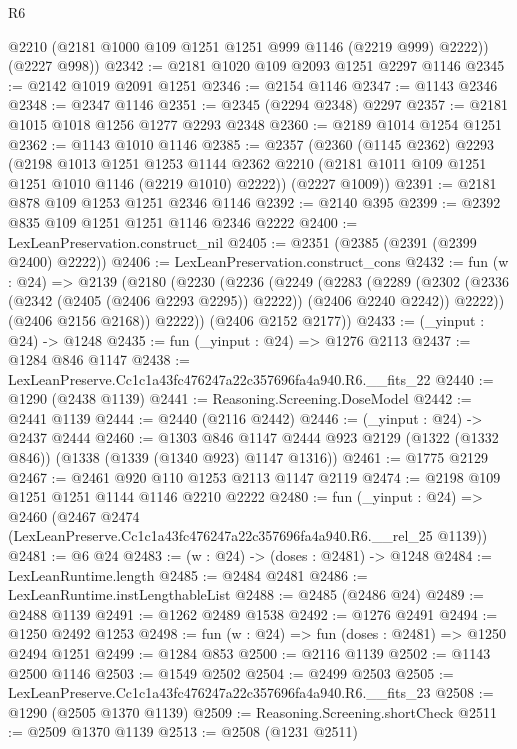 \begin{lexlean}{R6}
\begin{coremodule}
        @2210
        (@2181 @1000 @109 @1251 @1251 @999 @1146 (@2219 @999) @2222))
      (@2227 @998))
@2342 := @2181 @1020 @109 @2093 @1251 @2297 @1146
@2345 := @2142 @1019 @2091 @1251
@2346 := @2154 @1146
@2347 := @1143 @2346
@2348 := @2347 @1146
@2351 := @2345 (@2294 @2348) @2297
@2357 := @2181 @1015 @1018 @1256 @1277 @2293 @2348
@2360 := @2189 @1014 @1254 @1251
@2362 := @1143 @1010 @1146
@2385 := @2357
    (@2360
      (@1145 @2362)
      @2293
      (@2198
        @1013
        @1251
        @1253
        @1144
        @2362
        @2210
        (@2181 @1011 @109 @1251 @1251 @1010 @1146 (@2219 @1010) @2222))
      (@2227 @1009))
@2391 := @2181 @878 @109 @1253 @1251 @2346 @1146
@2392 := @2140 @395
@2399 := @2392 @835 @109 @1251 @1251 @1146 @2346 @2222
@2400 := LexLeanPreservation.construct_nil
@2405 := @2351 (@2385 (@2391 (@2399 @2400) @2222))
@2406 := LexLeanPreservation.construct_cons
@2432 := fun (w : @24) =>
  @2139
    (@2180
      (@2230
        (@2236
          (@2249
            (@2283
              (@2289
                (@2302 (@2336 (@2342 (@2405 (@2406 @2293 @2295)) @2222)) (@2406 @2240 @2242))
                @2222))
            (@2406 @2156 @2168))
          @2222))
      (@2406 @2152 @2177))
@2433 := (_yinput : @24) -> @1248
@2435 := fun (_yinput : @24) => @1276 @2113
@2437 := @1284 @846 @1147
@2438 := LexLeanPreserve.Cc1c1a43fc476247a22c357696fa4a940.R6.__fits_22
@2440 := @1290 (@2438 @1139)
@2441 := Reasoning.Screening.DoseModel
@2442 := @2441 @1139
@2444 := @2440 (@2116 @2442)
@2446 := (_yinput : @24) -> @2437 @2444
@2460 := @1303
    @846
    @1147
    @2444
    @923
    @2129
    (@1322 (@1332 @846))
    (@1338 (@1339 (@1340 @923) @1147 @1316))
@2461 := @1775 @2129
@2467 := @2461 @920 @110 @1253 @2113 @1147 @2119
@2474 := @2198 @109 @1251 @1251 @1144 @1146 @2210 @2222
@2480 := fun (_yinput : @24) =>
  @2460 (@2467 @2474 (LexLeanPreserve.Cc1c1a43fc476247a22c357696fa4a940.R6.__rel_25 @1139))
@2481 := @6 @24
@2483 := (w : @24) -> (doses : @2481) -> @1248
@2484 := LexLeanRuntime.length
@2485 := @2484 @2481
@2486 := LexLeanRuntime.instLengthableList
@2488 := @2485 (@2486 @24)
@2489 := @2488 @1139
@2491 := @1262 @2489 @1538
@2492 := @1276 @2491
@2494 := @1250 @2492 @1253
@2498 := fun (w : @24) => fun (doses : @2481) => @1250 @2494 @1251
@2499 := @1284 @853
@2500 := @2116 @1139
@2502 := @1143 @2500 @1146
@2503 := @1549 @2502
@2504 := @2499 @2503
@2505 := LexLeanPreserve.Cc1c1a43fc476247a22c357696fa4a940.R6.__fits_23
@2508 := @1290 (@2505 @1370 @1139)
@2509 := Reasoning.Screening.shortCheck
@2511 := @2509 @1370 @1139
@2513 := @2508 (@1231 @2511)

\end{coremodule}
\end{lexlean}
